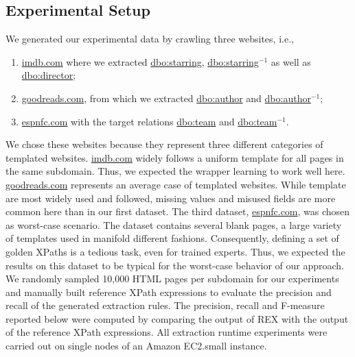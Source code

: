 \subsection{Experimental Setup}
We generated our experimental data by crawling three websites, i.e., 
\begin{enumerate}
\item \url{imdb.com} where we extracted \url{dbo:starring}, \url{dbo:starring}$^{-1}$ as well as \url{dbo:director};
\item \url{goodreads.com}, from which we extracted \url{dbo:author} and \url{dbo:author}$^{-1}$;
\item \url{espnfc.com} with the target relations \url{dbo:team} and \url{dbo:team}$^{-1}$.
\end{enumerate}
We chose these websites because they represent three different categories of templated websites.
\url{imdb.com} widely follows a uniform template for all pages in the same subdomain.
Thus, we expected the wrapper learning  to work well here.
\url{goodreads.com} represents an average case of templated websites. 
While template are most widely used and followed, missing values and misused fields are more common here than in our first dataset.
The third dataset, \url{espnfc.com}, was chosen as worst-case scenario.
The dataset contains several blank pages, a large variety of  templates used in manifold different fashions.
Consequently, defining a set of golden XPaths is a tedious task, even for trained experts.
Thus, we expected the results on this dataset to be typical for the worst-case behavior of our approach.
We randomly sampled 10,000 HTML pages per subdomain for our experiments and manually built reference XPath expressions to evaluate the precision and recall of the generated extraction rules. 
The precision, recall and F-measure reported below were computed by comparing the output of REX with the output of the reference XPath expressions.
All extraction runtime experiments were carried out on single nodes of an Amazon EC2.small instance.



